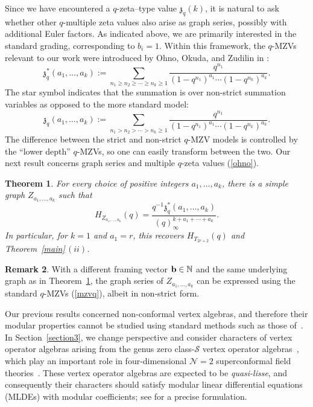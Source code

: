 \documentclass[pdftex]{sigma}
\numberwithin{equation}{section}
\newtheorem{Theorem}{Theorem}[section]
\theoremstyle{definition}
\newtheorem{Remark}[Theorem]{Remark}
\begin{document}
Since we have encountered a $q$-zeta–type value $\mathfrak{z}_q(k)$, it is natural to ask whether other $q$-multiple zeta values also arise as graph series, possibly with additional Euler factors.
As indicated above, we are primarily interested in the standard grading, corresponding to $b_i = 1$.
Within this framework, the $q$-MZVs relevant to our work were introduced by Ohno, Okuda, and Zudilin in \cite{Ohno}:
\begin{equation} \label{ohno}
\mathfrak{z}_q^*(a_1,\dots,a_k):=\sum_{n_1 \geq n_2 \geq \cdots \geq n_k \geq 1} \frac{q^{n_1}}{(1-q^{n_1})^{a_1} \cdots (1-q^{n_k})^{a_k}}.
\end{equation}
The star symbol indicates that the summation is over non-strict summation variables as opposed to the more standard model:
\[
\mathfrak{z}_q(a_1,\dots,a_k):=\sum_{n_1 > n_2 > \cdots > n_k \geq 1} \frac{q^{n_1}}{(1-q^{n_1})^{a_1} \cdots (1-q^{n_k})^{a_k}}.
\]
The difference between the strict and non-strict $q$-MZV models is controlled by the ``lower depth'' $q$-MZVs, so one can easily transform between the two.
Our next result concerns graph series and multiple $q$-zeta values (\ref{ohno}).
\begin{Theorem} \label{qmzv} For every choice of positive integers $a_1,\dots,a_k$, there is a simple graph $Z_{a_1,\dots,a_k}$ such that
\[
H_{Z_{a_1,\dots,a_k}}(q)=\frac{q^{-1} \mathfrak{z}_q^*(a_1,\dots,a_k)}{(q)^{k+a_1+\cdots +a_k}_\infty}.
\]
In particular, for $k=1$ and $a_1=r$, this recovers $H_{T_{2r+2}}(q)$ and Theorem~{\rm \ref{main}}\,$(ii)$.
\end{Theorem}

\begin{Remark}
{ With a different framing vector ${\bf b} \in \mathbb{N}$ and the same underlying graph as in Theorem~\ref{qmzv}, the graph series
of $Z_{a_1,\dots,a_k}$ can be expressed using the standard $q$-MZVs (\ref{mzvq}), albeit in non-strict form.}
\end{Remark}

Our previous results concerned non-conformal vertex algebras, and therefore their modular properties cannot be studied using standard methods such as those of~\cite{Zhu}.
In Section~\ref{section3}, we change perspective and consider characters of vertex operator algebras arising from the genus zero class-$\mathcal{S}$ vertex operator algebras~\cite{Arakawa,Beem}, which play an important role in four-dimensional $\mathcal{N}=2$ superconformal field theories~\cite{BR,Beem}.
These vertex operator algebras are expected to be \emph{quasi-lisse}, and consequently their characters should satisfy modular linear differential equations (MLDEs) with modular coefficients; see \cite{AK} for a precise formulation.
\end{document}
